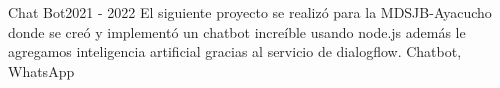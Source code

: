 
\begin{projects}


	\project
	{Chat Bot}{2021 - 2022}
	{ }
	{El siguiente proyecto se realizó para la MDSJB-Ayacucho donde se creó y implementó un chatbot increíble usando node.js además le agregamos inteligencia artificial gracias al servicio de dialogflow.}
	{Chatbot, WhatsApp}

\end{projects}